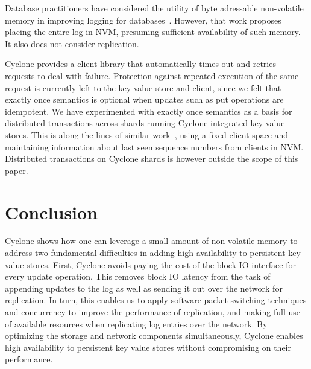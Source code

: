 \documentclass[pageno]{jpaper}
\begin{document}
Database practitioners have considered the utility of byte adressable
non-volatile memory in improving logging for
databases~\cite{nvram_log}. However, that work proposes placing the entire log
in NVM, presuming sufficient availability of such memory. It also does not
consider replication.

Cyclone provides a client library that automatically times out and retries
requests to deal with failure. Protection against repeated execution of the same
request is currently left to the key value store and client, since we felt that
exactly once semantics is optional when updates such as put operations are
idempotent. We have experimented with exactly once semantics as a basis for
distributed transactions across shards running Cyclone integrated key value
stores. This is along the lines of similar work~\cite{raft_lin}, using a fixed
client space and maintaining information about last seen sequence numbers from
clients in NVM. Distributed transactions on Cyclone shards is however outside
the scope of this paper.

\section{Conclusion}
Cyclone shows how one can leverage a small amount of non-volatile memory to
address two fundamental difficulties in adding high availability to persistent
key value stores. First, Cyclone avoids
paying the cost of the block IO interface for every update operation. This
removes block IO latency from the task of appending updates to the log as well
as sending it out over the network for replication. In turn, this enables us to
apply software packet switching techniques and concurrency to improve the
performance of replication, and making full use of available resources when
replicating log entries over the network. By optimizing the storage and network
components simultaneously, Cyclone enables high availability to persistent key
value stores without compromising on their performance.
\newcommand\myurl[2]{\url{#1}}


\end{document}
